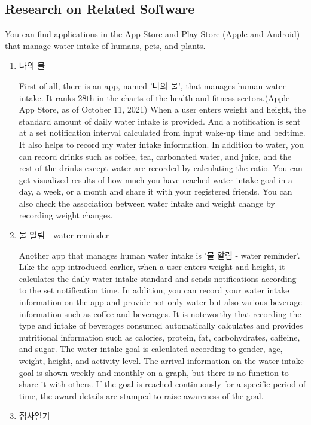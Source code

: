 \documentclass[conference]{IEEEtran}
\begin{document}
\subsection{Research on Related Software}
You can find applications in the App Store and Play Store (Apple and Android) that manage water intake of humans, pets, and plants.\\
\begin{enumerate}
\setlength{\parindent}{2ex}
\setlength{\parskip}{0.5em}
\item 나의 물 

First of all, there is an app, named '나의 물', that manages human water intake. It ranks 28th in the charts of the health and fitness sectors.(Apple App Store, as of October 11, 2021) When a user enters weight and height, the standard amount of daily water intake is provided. And a notification is sent at a set notification interval calculated from input wake-up time and bedtime. It also helps to record my water intake information. In addition to water, you can record drinks such as coffee, tea, carbonated water, and juice, and the rest of the drinks except water are recorded by calculating the ratio. You can get visualized results of how much you have reached water intake goal in a day, a week, or a month and share it with your registered friends. You can also check the association between water intake and weight change by recording weight changes.
\item 물 알림 - water reminder 

Another app that manages human water intake is '물 알림 - water reminder'. Like the app introduced earlier, when a user enters weight and height, it calculates the daily water intake standard and sends notifications according to the set notification time. In addition, you can record your water intake information on the app and provide not only water but also various beverage information such as coffee and beverages. It is noteworthy that recording the type and intake of beverages consumed automatically calculates and provides nutritional information such as calories, protein, fat, carbohydrates, caffeine, and sugar. The water intake goal is calculated according to gender, age, weight, height, and activity level. The arrival information on the water intake goal is shown weekly and monthly on a graph, but there is no function to share it with others. If the goal is reached continuously for a specific period of time, the award details are stamped to raise awareness of the goal.
\item 집사일기


\end{enumerate}
\end{document}
